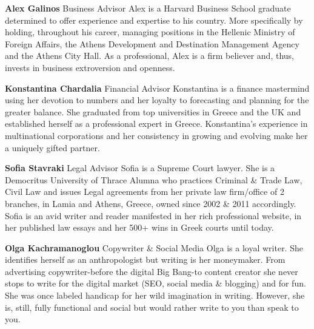 \bigskip
\noindent
\textbf{Alex Galinos}\newline
\medskip Business Advisor
\newline 
Alex is a Harvard Business School graduate determined to offer experience and expertise to his country. More specifically by holding, throughout his career, managing positions in the Hellenic Ministry of Foreign Affairs, the Athens Development and Destination Management Agency and the Athens City Hall. As a professional, Alex is a firm believer and, thus, invests in business extroversion and openness.
\par
\bigskip
\noindent
\textbf{Konstantina Chardalia}\newline
\medskip Financial Advisor
\newline
Konstantina is a finance mastermind using her devotion to numbers and her loyalty to forecasting and planning for the greater balance. She graduated from top universities in Greece and the UK and established herself as a professional expert in Greece. Konstantina’s experience in multinational corporations and her consistency in growing and evolving make her a uniquely gifted partner.
\par
\bigskip
\noindent
\textbf{Sofia Stavraki}\newline
\medskip Legal Advisor
\newline
Sofia is a Supreme Court lawyer. She is a Democritus University of Thrace Alumna who practices Criminal \& Trade Law, Civil Law and issues Legal agreements from her private law firm/office of 2 branches, in Lamia and Athens, Greece, owned since 2002 \& 2011 accordingly. Sofia is an avid writer and reader manifested in her rich professional website, in her published law essays and her 500+ wins in Greek courts until today.
\par

\bigskip
\noindent
\textbf{Olga Kachramanoglou}\newline
\medskip Copywriter \& Social Media 
\newline
Olga is a loyal writer. She identifies herself as an anthropologist but writing is her moneymaker. From advertising copywriter-before the digital Big Bang-to content creator she never stops to write for the digital market (SEO, social media \& blogging) and for fun. She was once labeled handicap for her wild imagination in writing. However, she is, still, fully functional and social but would rather write to you than speak to you.
 \par